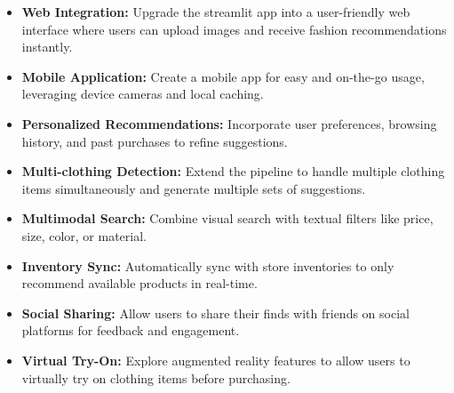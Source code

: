 \vspace{-0.45em}
\begin{itemize}
    \setlength\itemsep{-1.05em}
    \item \textbf{Web Integration:} Upgrade the streamlit app into a user-friendly web interface where users can upload images and receive fashion recommendations instantly.
    \item \textbf{Mobile Application:} Create a mobile app for easy and on-the-go usage, leveraging device cameras and local caching.
    \item \textbf{Personalized Recommendations:} Incorporate user preferences, browsing history, and past purchases to refine suggestions.
    \item \textbf{Multi-clothing Detection:} Extend the pipeline to handle multiple clothing items simultaneously and generate multiple sets of suggestions.
    \item \textbf{Multimodal Search:} Combine visual search with textual filters like price, size, color, or material.
    \item \textbf{Inventory Sync:} Automatically sync with store inventories to only recommend available products in real-time.
    \item \textbf{Social Sharing:} Allow users to share their finds with friends on social platforms for feedback and engagement.
    \item \textbf{Virtual Try-On:} Explore augmented reality features to allow users to virtually try on clothing items before purchasing.
\end{itemize}